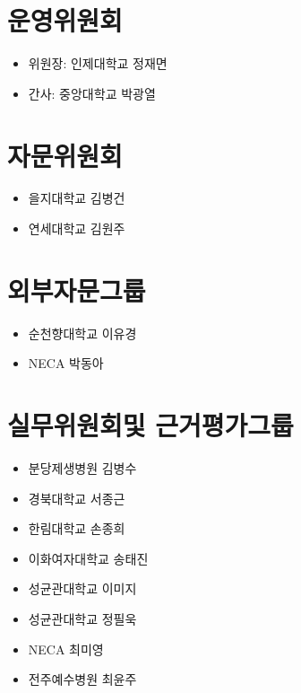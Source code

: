 \documentclass[]{book}
\providecommand{\tightlist}{%
  \setlength{\itemsep}{0pt}\setlength{\parskip}{0pt}}
\begin{document}
\hypertarget{section-29}{%
\section*{운영위원회}\label{section-29}}

\begin{itemize}
\tightlist
\item
  위원장: 인제대학교 정재면
\item
  간사: 중앙대학교 박광열
\end{itemize}

\hypertarget{section-30}{%
\section*{자문위원회}\label{section-30}}

\begin{itemize}
\tightlist
\item
  을지대학교 김병건
\item
  연세대학교 김원주
\end{itemize}

\hypertarget{section-31}{%
\section*{외부자문그룹}\label{section-31}}

\begin{itemize}
\tightlist
\item
  순천향대학교 이유경
\item
  NECA 박동아
\end{itemize}

\hypertarget{section-32}{%
\section*{실무위원회및 근거평가그룹}\label{section-32}}

\begin{itemize}
\tightlist
\item
  분당제생병원 김병수
\item
  경북대학교 서종근
\item
  한림대학교 손종희
\item
  이화여자대학교 송태진
\item
  성균관대학교 이미지
\item
  성균관대학교 정필욱
\item
  NECA 최미영
\item
  전주예수병원 최윤주
\end{itemize}
\end{document}
